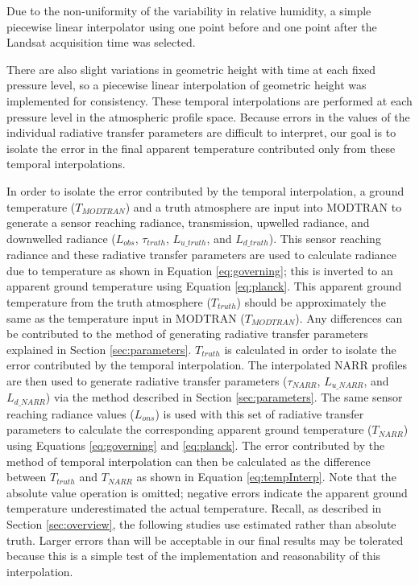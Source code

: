 \documentclass{book}
\begin{document}
Due to the non-uniformity of the variability in relative humidity, a simple piecewise linear interpolator using one point before and one point after the Landsat acquisition time was selected.  

There are also slight variations in geometric height with time at each fixed pressure level, so a piecewise linear interpolation of geometric height was implemented for consistency.  These temporal interpolations are performed at each pressure level in the atmospheric profile space.  Because errors in the values of the individual radiative transfer parameters are difficult to interpret, our goal is to isolate the error in the final apparent temperature contributed only from these temporal interpolations.

In order to isolate the error contributed by the temporal interpolation, a ground temperature ($T_{MODTRAN}$) and a truth atmosphere are input into MODTRAN to generate a sensor reaching radiance, transmission, upwelled radiance, and downwelled radiance ($L_{obs}$, $\tau_{truth}$, $L_{u\_truth}$, and $L_{d\_truth}$).  This sensor reaching radiance and these radiative transfer parameters are used to calculate radiance due to temperature as shown in Equation \ref{eq:governing}; this is inverted to an apparent ground temperature using Equation \ref{eq:planck}.  This apparent ground temperature from the truth atmosphere ($T_{truth}$) should be approximately the same as the temperature input in MODTRAN ($T_{MODTRAN}$).  Any differences can be contributed to the method of generating radiative transfer parameters explained in Section \ref{sec:parameters}.  $T_{truth}$ is calculated in order to isolate the error contributed by the temporal interpolation.  The interpolated NARR profiles are then used to generate radiative transfer parameters ($\tau_{NARR}$, $L_{u\_NARR}$, and $L_{d\_NARR}$) via the method described in Section \ref{sec:parameters}.  The same sensor reaching radiance values ($L_{ons}$) is used with this set of radiative transfer parameters to calculate the corresponding apparent ground temperature ($T_{NARR}$) using Equations \ref{eq:governing} and \ref{eq:planck}.  The error contributed by the method of temporal interpolation can then be calculated as the difference between $T_{truth}$ and $T_{NARR}$ as shown in Equation \ref{eq:tempInterp}.  Note that the absolute value operation is omitted; negative errors indicate the apparent ground temperature underestimated the actual temperature.  Recall, as described in Section \ref{sec:overview}, the following studies use estimated rather than absolute truth.  Larger errors than will be acceptable in our final results may be tolerated because this is a simple test of the implementation and reasonability of this interpolation.
\end{document}
